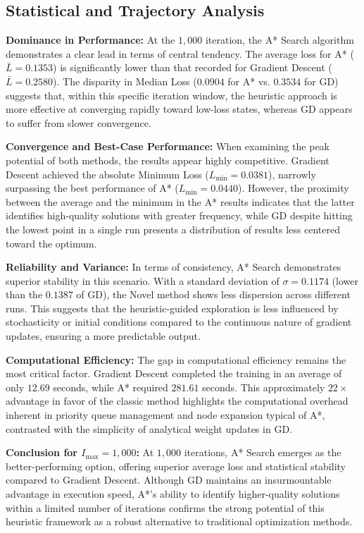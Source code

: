 \subsection*{Statistical and Trajectory Analysis}

\noindent \textbf{Dominance in Performance:} At the $1,000$ iteration, the A* Search algorithm demonstrates a clear lead in terms of central tendency. The average loss for A* ($\bar{L} = 0.1353$) is significantly lower than that recorded for Gradient Descent ($\bar{L} = 0.2580$). The disparity in Median Loss ($0.0904$ for A* vs. $0.3534$ for GD) suggests that, within this specific iteration window, the heuristic approach is more effective at converging rapidly toward low-loss states, whereas GD appears to suffer from slower convergence.

\noindent \textbf{Convergence and Best-Case Performance:} When examining the peak potential of both methods, the results appear highly competitive. Gradient Descent achieved the absolute Minimum Loss ($L_{\min} = 0.0381$), narrowly surpassing the best performance of A* ($L_{\min} = 0.0440$). However, the proximity between the average and the minimum in the A* results indicates that the latter identifies high-quality solutions with greater frequency, while GD despite hitting the lowest point in a single run presents a distribution of results less centered toward the optimum.

\noindent \textbf{Reliability and Variance:} In terms of consistency, A* Search demonstrates superior stability in this scenario. With a standard deviation of $\sigma = 0.1174$ (lower than the $0.1387$ of GD), the Novel method shows less dispersion across different runs. This suggests that the heuristic-guided exploration is less influenced by stochasticity or initial conditions compared to the continuous nature of gradient updates, ensuring a more predictable output.

\noindent \textbf{Computational Efficiency:} The gap in computational efficiency remains the most critical factor. Gradient Descent completed the training in an average of only $12.69$ seconds, while A* required $281.61$ seconds. This approximately $22\times$ advantage in favor of the classic method highlights the computational overhead inherent in priority queue management and node expansion typical of A*, contrasted with the simplicity of analytical weight updates in GD.

\noindent \textbf{Conclusion for $I_{\text{max}}=1,000$:} At $1,000$ iterations, A* Search emerges as the better-performing option, offering superior average loss and statistical stability compared to Gradient Descent. Although GD maintains an insurmountable advantage in execution speed, A*'s ability to identify higher-quality solutions within a limited number of iterations confirms the strong potential of this heuristic framework as a robust alternative to traditional optimization methods.

